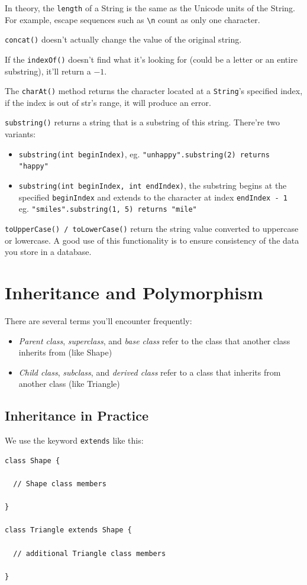 \documentclass[a4paper, 12pt]{article}
\begin{document}
In theory, the \verb|length| of a String is the same as the Unicode units of the String. For example, escape sequences such as \verb|\n| count as only one character.

\verb|concat()| doesn't actually change the value of the original string.

If the \verb|indexOf()| doesn't find what it's looking for (could be a letter or an entire substring), it'll return a $-1$.

The \verb|charAt()| method returns the character located at a \verb|String|'s specified index, if the index is out of str's range, it will produce an error.

\verb|substring()| returns a string that is a substring of this string. There're two variants:
\begin{itemize}
\item \verb|substring(int beginIndex)|, eg. \verb|"unhappy".substring(2) returns "happy"|

\item \verb|substring(int beginIndex, int endIndex)|, the substring begins at the specified \verb|beginIndex| and extends to the character at index \verb|endIndex - 1|\\ eg. \verb|"smiles".substring(1, 5) returns "mile"|

\end{itemize}

\verb|toUpperCase() / toLowerCase()| return the string value converted to uppercase or lowercase. A good use of this functionality is to ensure consistency of the data you store in a database.


\section{Inheritance and Polymorphism}
There are several terms you'll encounter frequently:
\begin{itemize}
\item \textit{Parent class}, \textit{superclass}, and \textit{base class} refer to the class that another class inherits from (like Shape)

\item \textit{Child class}, \textit{subclass}, and \textit{derived class} refer to a class that inherits from another class (like Triangle)

\end{itemize}

\subsection{Inheritance in Practice}
We use the keyword \verb|extends| like this:
\begin{verbatim}
class Shape {

  // Shape class members

}

class Triangle extends Shape {

  // additional Triangle class members

}
\end{verbatim}
\end{document}

